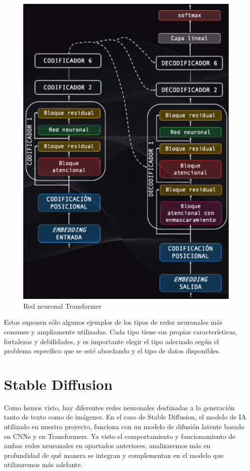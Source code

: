 \begin{figure}[h]
	\centering
	\includegraphics[width = 0.7 \textwidth]{Imagenes/Vectorial/transformer.png}
	\caption{Red neuronal Transformer}
	\label{fig:transformer}
\end{figure}

Estos suponen sólo algunos ejemplos de los tipos de redes neuronales más comunes y ampliamente utilizadas. Cada tipo tiene sus propias características, fortalezas y debilidades, y es importante elegir el tipo adecuado según el problema específico que se esté abordando y el tipo de datos disponibles.\\

 \section{Stable Diffusion}

Como hemos visto, hay diferentes redes neuronales destinadas a la generación tanto de texto como de imágenes. En el caso de Stable Diffusion, el modelo de IA utilizado en nuestro proyecto, funciona con un modelo de difusión latente basado en CNNs y en Transformers. Ya visto el comportamiento y funcionamiento de ambas redes neuronales en apartados anteriores, analizaremos más en profundidad de qué manera se integran y complementan en el modelo que utilizaremos más adelante.\\


